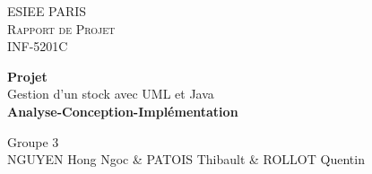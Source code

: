 \begin{titlepage}
\begin{center}

	\textsc{\LARGE ESIEE PARIS}\\
	\textsc{Rapport de Projet}\\
	\textsc{INF-5201C}\\[7cm]

	\begin{minipage}{0.8\textwidth}
		\begin{center}
		{ \huge \textbf{Projet} }\\[0.5cm]
		{ \huge Gestion d'un stock avec UML et Java}\\[0.5cm]
		{ \huge \textbf{Analyse-Conception-Implémentation} }
		\end{center}
	\end{minipage}

	\vfill

	{\large Groupe 3 } \\
	{\large NGUYEN Hong Ngoc \& PATOIS Thibault \& ROLLOT Quentin}
\end{center}
\end{titlepage}